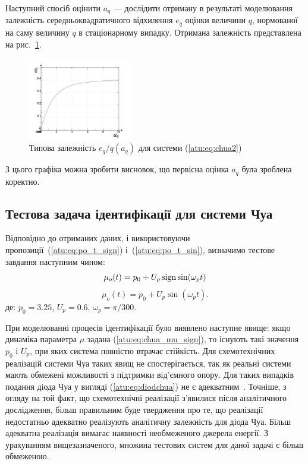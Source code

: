 Наступний спосіб оцінити
$a_q $ --- дослідити отриману в результаті моделювання залежність
середньоквадратичного відхилення
$e_q $ оцінки величини
$q$, нормованої на саму величину
$q$ в стаціонарному випадку. Отримана залежність представлена
на рис.~\ref{atu:f:chua_tau}.

\begin{figure}[htb!]
\begin{center}
  \includegraphics[width=0.4\textwidth]{p/cha/chua/chua_tau-p_e_a.png}
\end{center}
\caption{Типова залежність $ e_q / q (a_q) $ для системи (\ref{atu:eq:chua2})}
\label{atu:f:chua_tau}
\end{figure}

З цього графіка можна зробити висновок, що первісна оцінка $a_q$ була зроблена коректно.


\subsection{Тестова задача ідентифікації для системи Чуа}%

Відповідно до отриманих даних, і використовуючи
пропозиції~(\ref{atu:eq:po_t_sign}) і~(\ref{atu:eq:po_t_sin}), визначимо тестове
завдання наступним чином:
%
\begin{equation}
 \mu_o(t) = p_0 + U_p \operatorname*{sign} \sin( \omega_p t )
  \label{atu:eq:chua_mu_sign}
\end{equation}
%
\begin{equation}
 \mu_o(t) = p_0 + U_p \sin( \omega_p t ).
  \label{atu:eq:chua_mu_sin}
\end{equation}
%
де:
$p_0 = 3.25$, $U_p=0.6$, $\omega_p = \pi / 300$.

При моделюванні процесів ідентифікації було виявлено наступне
явище: якщо динаміка параметра
$ \mu $ задана (\ref{atu:eq:chua_mu_sign}), то існують такі значення
$ p_0 $ і $ U_p $, при яких система повністю втрачає стійкість. Для
схемотехнічних реалізацій системи Чуа таких явищ не
спостерігається, так як реальні системи мають обмежені
можливості з підтримки від'ємного опору. Для таких
випадків подання діода Чуа у вигляді (\ref{atu:eq:diodchua}) не є
адекватним~\cite{atu_kher2014}. Точніше, з огляду на той факт, що
схемотехнічні реалізації з'явилися після аналітичного
дослідження, більш правильним буде твердження про те, що реалізації
недостатньо адекватно реалізують аналітичну залежність
для діода Чуа. Більш адекватна реалізація вимагає наявності
необмеженого джерела енергії. З урахуванням вищезазначеного,
множина тестових систем для даної задачі є більш обмеженою.

